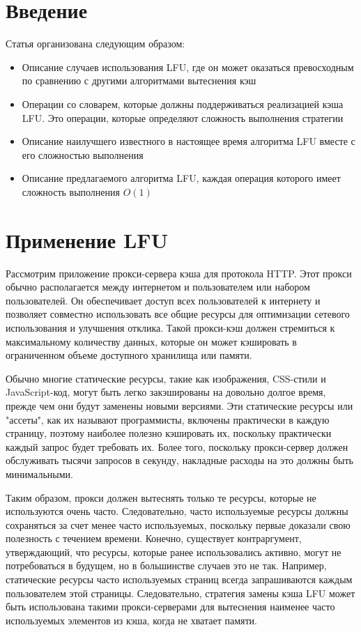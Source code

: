 \documentclass[a4paper, 12pt]{article}
\begin{document}
\section{Введение}

Статья организована следующим образом:

\begin{itemize}
    \item Описание случаев использования LFU, где он может оказаться превосходным по сравнению с другими алгоритмами вытеснения кэш
    \item Операции со словарем, которые должны поддерживаться реализацией кэша LFU. Это операции, которые определяют сложность выполнения стратегии
    \item Описание наилучшего известного в настоящее время алгоритма LFU вместе с его сложностью выполнения
    \item Описание предлагаемого алгоритма LFU, каждая операция которого имеет сложность выполнения $O(1)$
\end{itemize}

\section{Применение LFU}

Рассмотрим приложение прокси-сервера кэша для протокола HTTP. Этот прокси обычно располагается между интернетом и пользователем или набором пользователей. Он обеспечивает доступ всех пользователей к интернету и позволяет совместно использовать все общие ресурсы для оптимизации сетевого использования и улучшения отклика. Такой прокси-кэш должен стремиться к максимальному количеству данных, которые он может кэшировать в ограниченном объеме доступного хранилища или памяти.

Обычно многие статические ресурсы, такие как изображения, CSS-стили и JavaScript-код, могут быть легко закэшированы на довольно долгое время, прежде чем они будут заменены новыми версиями. Эти статические ресурсы или "ассеты", как их называют программисты, включены практически в каждую страницу, поэтому наиболее полезно кэшировать их, поскольку практически каждый запрос будет требовать их. Более того, поскольку прокси-сервер должен обслуживать тысячи запросов в секунду, накладные расходы на это должны быть минимальными.

Таким образом, прокси должен вытеснять только те ресурсы, которые не используются очень часто. Следовательно, часто используемые ресурсы должны сохраняться за счет менее часто используемых, поскольку первые доказали свою полезность с течением времени. Конечно, существует контраргумент, утверждающий, что ресурсы, которые ранее использовались активно, могут не потребоваться в будущем, но в большинстве случаев это не так. Например, статические ресурсы часто используемых страниц всегда запрашиваются каждым пользователем этой страницы. Следовательно, стратегия замены кэша LFU может быть использована такими прокси-серверами для вытеснения наименее часто используемых элементов из кэша, когда не хватает памяти.
\end{document}
